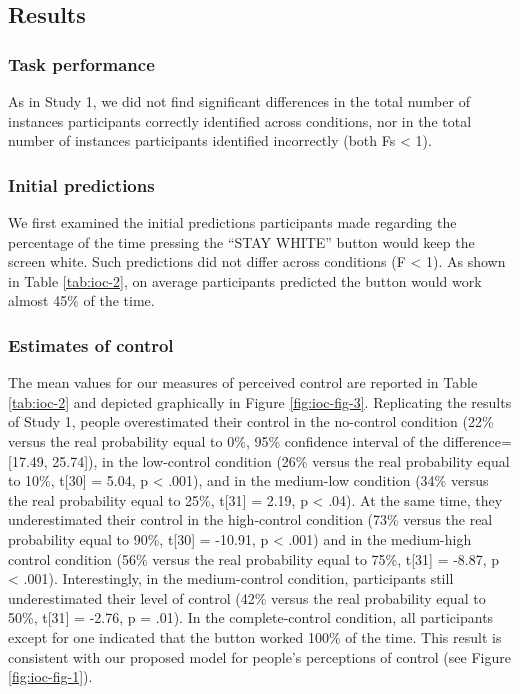 \documentclass[USenglish,letterpaper,12pt,extrafontsizes,oneside,onecolumn,final]{memoir}
\begin{document}
\subsection{Results}

\subsubsection{Task performance}
As in Study 1, we did not find significant differences in the total number of instances participants correctly identified across conditions, nor in the total number of instances participants identified incorrectly (both Fs < 1).

\subsubsection{Initial predictions}
We first examined the initial predictions participants made regarding the percentage of the time pressing the ``STAY WHITE'' button would keep the screen white. Such predictions did not differ across conditions (F < 1). As shown in Table \ref{tab:ioc-2}, on average participants predicted the button would work almost 45\% of the time. 

\subsubsection{Estimates of control}
The mean values for our measures of perceived control are reported in Table \ref{tab:ioc-2} and depicted graphically in Figure \ref{fig:ioc-fig-3}. Replicating the results of Study 1, people overestimated their control in the no-control condition (22\% versus the real probability equal to 0\%, 95\% confidence interval of the difference=[17.49, 25.74]), in the low-control condition (26\% versus the real probability equal to 10\%, t[30] = 5.04, p < .001), and in the medium-low condition (34\% versus the real probability equal to 25\%, t[31] = 2.19, p < .04). At the same time, they underestimated their control in the high-control condition (73\% versus the real probability equal to 90\%, t[30] = -10.91, p < .001) and in the medium-high control condition (56\% versus the real probability equal to 75\%, t[31] = -8.87, p < .001). Interestingly, in the medium-control condition, participants still underestimated their level of control (42\% versus the real probability equal to 50\%, t[31] = -2.76, p = .01). In the complete-control condition, all participants except for one indicated that the button worked 100\% of the time. This result is consistent with our proposed model for people's perceptions of control (see Figure \ref{fig:ioc-fig-1}). 
\end{document}
